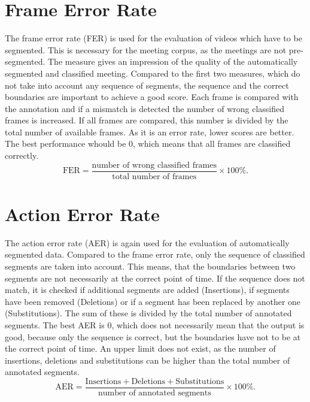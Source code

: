 \section{Frame Error Rate}
The frame error rate (FER) is used for the evaluation of videos which have to be segmented. This is necessary for the meeting corpus, as the meetings are not pre-segmented. The measure gives an impression of the quality of the automatically segmented and classified meeting. Compared to the first two measures, which do not take into account any sequence of segments, the sequence and the correct boundaries are important to achieve a good score. Each frame is compared with the annotation and if a mismatch is detected the number of wrong classified frames is increased. If all frames are compared, this number is divided by the total number of available frames. As it is an error rate, lower scores are better. The best performance whould be $0$, which means that all frames are classified correctly.
\begin{equation*}
	\textrm{FER} = \frac{\textrm{number of wrong classified frames}}{\textrm{total number of frames}} \times 100\%.
\end{equation*}

\section{Action Error Rate}
The action error rate (AER) is again used for the evaluation of automatically segmented data. Compared to the frame error rate, only the sequence of classified segments are taken into account. This means, that the boundaries between two segments are not necessarily at the correct point of time. If the sequence does not match, it is checked if additional segments are added (Insertions), if segments have been removed (Deletions) or if a segment has been replaced by another one (Substitutions). The sum of these is divided by the total number of annotated segments. The best AER is $0$, which does not necessarily mean that the output is good, because only the sequence is correct, but the boundaries have not to be at the correct point of time. An upper limit does not exist, as the number of insertions, deletions and substitutions can be higher than the total number of annotated segments. 
\begin{equation*}
	\textrm{AER} = \frac{\textrm{Insertions} + \textrm{Deletions} + \textrm{Substitutions}}{\textrm{number of annotated segments}} \times 100\%.
\end{equation*}

